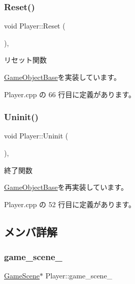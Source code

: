 \subsubsection{\texorpdfstring{Reset()}{Reset()}}
{\footnotesize\ttfamily void Player\+::\+Reset (\begin{DoxyParamCaption}{ }\end{DoxyParamCaption})\hspace{0.3cm}{\ttfamily [override]}, {\ttfamily [virtual]}}



リセット関数 



\mbox{\hyperlink{class_game_object_base_a85c59554f734bcb09f1a1e18d9517dce}{Game\+Object\+Base}}を実装しています。



 Player.\+cpp の 66 行目に定義があります。

\mbox{\label{class_player_a7455a83ac23d2f5e0cce0ddd7d92db0c}} 
\subsubsection{\texorpdfstring{Uninit()}{Uninit()}}
{\footnotesize\ttfamily void Player\+::\+Uninit (\begin{DoxyParamCaption}{ }\end{DoxyParamCaption})\hspace{0.3cm}{\ttfamily [override]}, {\ttfamily [virtual]}}



終了関数 



\mbox{\hyperlink{class_game_object_base_a97e1bc277d7b1c0156d4735de29a022c}{Game\+Object\+Base}}を再実装しています。



 Player.\+cpp の 52 行目に定義があります。



\subsection{メンバ詳解}
\mbox{\label{class_player_ab41e7ebf6f975f2eea365923bc2dca7f}} 
\subsubsection{\texorpdfstring{game\+\_\+scene\+\_\+}{game\_scene\_}}
{\footnotesize\ttfamily \mbox{\hyperlink{class_game_scene}{Game\+Scene}}$\ast$ Player\+::game\+\_\+scene\+\_\+}



